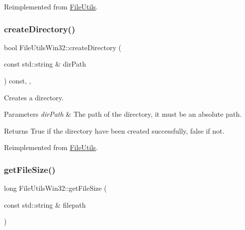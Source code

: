 Reimplemented from \hyperlink{classFileUtils_a04129d55c22dfa031fd45aeda4de5e77}{File\+Utils}.

\mbox{\label{classFileUtilsWin32_a9da58952832ce4abc6c241e9db52a914}} 
\subsubsection{\texorpdfstring{create\+Directory()}{createDirectory()}\hspace{0.1cm}{\footnotesize\ttfamily [2/2]}}
{\footnotesize\ttfamily bool File\+Utils\+Win32\+::create\+Directory (\begin{DoxyParamCaption}\item[{const std\+::string \&}]{dir\+Path }\end{DoxyParamCaption}) const\hspace{0.3cm}{\ttfamily [override]}, {\ttfamily [protected]}, {\ttfamily [virtual]}}

Creates a directory.


\begin{DoxyParams}{Parameters}
{\em dir\+Path} & The path of the directory, it must be an absolute path. \\
\hline
\end{DoxyParams}
\begin{DoxyReturn}{Returns}
True if the directory have been created successfully, false if not. 
\end{DoxyReturn}


Reimplemented from \hyperlink{classFileUtils_a9d9383b68669dcbef30165514f26d7f6}{File\+Utils}.

\mbox{\label{classFileUtilsWin32_af5e36ed946d6fc00cbb279755dbc6c5f}} 
\subsubsection{\texorpdfstring{get\+File\+Size()}{getFileSize()}\hspace{0.1cm}{\footnotesize\ttfamily [1/3]}}
{\footnotesize\ttfamily long File\+Utils\+Win32\+::get\+File\+Size (\begin{DoxyParamCaption}\item[{const std\+::string \&}]{filepath }\end{DoxyParamCaption})\hspace{0.3cm}{\ttfamily [virtual]}}

